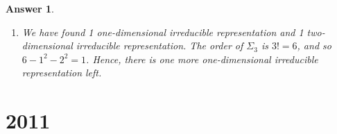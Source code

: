 \documentclass[a4paper]{article}
\newtheorem{ans}{Answer}[section]
\theoremstyle{new}
\begin{document}
\begin{ans}
\begin{enumerate}[label=(\roman*)]
For each $M$ of the 6 matrices, we take $M'=R^\dag MR$, then
$$I'=\begin{pmatrix}1&0&0\\0&1&0\\0&0&1\\\end{pmatrix},\quad A'=\begin{pmatrix}1&0&0\\0&e^{i2\pi/3}&0\\0&0&e^{-i2\pi/3}\\\end{pmatrix},\quad  B'=\begin{pmatrix}1&0&0\\0&e^{-i2\pi/3}&0\\0&0&e^{i2\pi/3}\\\end{pmatrix}$$
$$C'=\begin{pmatrix}1&0&0\\0&0&e^{i2\pi/3}\\0&e^{-i2\pi/3}&0\\\end{pmatrix},\quad D'=\begin{pmatrix}1&0&0\\0&0&e^{-i2\pi/3}\\0&e^{i2\pi/3}&0\\\end{pmatrix},\quad  E'=\begin{pmatrix}1&0&0\\0&0&1\\0&1&0\\\end{pmatrix}$$
\item We have found 1 one-dimensional irreducible representation and 1 two-dimensional irreducible representation. The order of $\Sigma_3$ is $3!=6$, and so $6-1^2-2^2=1$. Hence, there is one more one-dimensional irreducible representation left.
\end{enumerate}
\end{ans}
\newpage
\section{2011}
\end{document}
